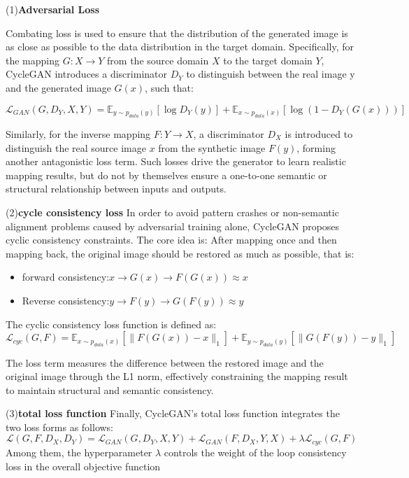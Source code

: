 \documentclass[a4paper,fleqn]{cas-sc}
\begin{document}
(1)\textbf{Adversarial Loss}

Combating loss is used to ensure that the distribution of the generated image is as close as possible to the data distribution in the target domain. Specifically, for the mapping $G:X \rightarrow Y$ from the source domain $X$ to the target domain $Y$, CycleGAN introduces a discriminator $D_Y$ to distinguish between the real image y and the generated image $G(x)$, such that:

\begin{equation}
	\mathcal{L}_{GAN}(G, D_Y, X, Y) = \mathbb{E}_{y \sim p_{data}(y)}[\log D_Y(y)] + \mathbb{E}_{x \sim p_{data}(x)}[\log(1 - D_Y(G(x)))]
\end{equation}


Similarly, for the inverse mapping $F:Y \rightarrow X$, a discriminator $D_X$ is introduced to distinguish the real source image $x$ from the synthetic image $F(y)$, forming another antagonistic loss term.
Such losses drive the generator to learn realistic mapping results, but do not by themselves ensure a one-to-one semantic or structural relationship between inputs and outputs.


(2)\textbf{cycle consistency loss}
In order to avoid pattern crashes or non-semantic alignment problems caused by adversarial training alone, CycleGAN proposes cyclic consistency constraints. The core idea is: After mapping once and then mapping back, the original image should be restored as much as possible, that is:

\begin{itemize}
	\item forward consistency:$x \rightarrow G(x) \rightarrow F(G(x)) \approx x$
	\item Reverse consistency:$y \rightarrow F(y) \rightarrow G(F(y)) \approx y$
\end{itemize}

The cyclic consistency loss function is defined as:
\begin{equation}
	\mathcal{L}_{cyc}(G, F) = \mathbb{E}_{x \sim p_{data}(x)}[\|F(G(x)) - x\|_1] + \mathbb{E}_{y \sim p_{data}(y)}[\|G(F(y)) - y\|_1]
\end{equation}

The loss term measures the difference between the restored image and the original image through the L1 norm, effectively constraining the mapping result to maintain structural and semantic consistency.

(3)\textbf{total loss function}
Finally, CycleGAN's total loss function integrates the two loss forms as follows: 
\begin{equation}
	\mathcal{L}(G, F, D_X, D_Y) = \mathcal{L}_{GAN}(G, D_Y, X, Y) + \mathcal{L}_{GAN}(F, D_X, Y, X) + \lambda \mathcal{L}_{cyc}(G, F)
\end{equation}
Among them, the hyperparameter $\lambda$ controls the weight of the loop consistency loss in the overall objective function
\end{document}
